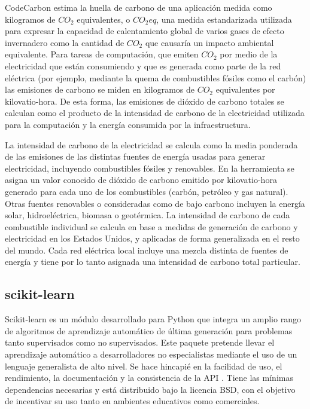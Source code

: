 CodeCarbon estima la huella de carbono de una aplicación medida como kilogramos de $CO_{2}$ equivalentes, o $CO_{2}eq$, una medida estandarizada utilizada para expresar la capacidad de calentamiento global de varios gases de efecto invernadero como la cantidad de $CO_{2}$ que causaría un impacto ambiental equivalente. Para tareas de computación, que emiten $CO_{2}$ por medio de la electricidad que están consumiendo y que es generada como parte de la red eléctrica (por ejemplo, mediante la quema de combustibles fósiles como el carbón) las emisiones de carbono se miden en kilogramos de $CO_{2}$ equivalentes por kilovatio-hora. De esta forma, las emisiones de dióxido de carbono totales se calculan como el producto de la intensidad de carbono de la electricidad utilizada para la computación y la energía consumida por la infraestructura.

La intensidad de carbono de la electricidad se calcula como la media ponderada de las emisiones de las distintas fuentes de energía usadas para generar electricidad, incluyendo combustibles fósiles y renovables. En la herramienta se asigna un valor conocido de dióxido de carbono emitido por kilovatio-hora generado para cada uno de los combustibles (carbón, petróleo y gas natural). Otras fuentes renovables o consideradas como de bajo carbono incluyen la energía solar, hidroeléctrica, biomasa o geotérmica. La intensidad de carbono de cada combustible individual se calcula en base a medidas de generación de carbono y electricidad en los Estados Unidos, y aplicadas de forma generalizada en el resto del mundo. Cada red eléctrica local incluye una mezcla distinta de fuentes de energía y tiene por lo tanto asignada una intensidad de carbono total particular.

\subsection{scikit-learn}

Scikit-learn \cite{scikit-learn} es un módulo desarrollado para Python que integra un amplio rango de algoritmos de aprendizaje automático de última generación para problemas tanto supervisados como no supervisados. Este paquete pretende llevar el aprendizaje automático a desarrolladores no especialistas mediante el uso de un lenguaje generalista de alto nivel. Se hace hincapié en la facilidad de uso, el rendimiento, la documentación y la consistencia de la API \cite{scikit-learn-api}. Tiene las mínimas dependencias necesarias y está distribuido bajo la licencia BSD, con el objetivo de incentivar su uso tanto en ambientes educativos como comerciales.

